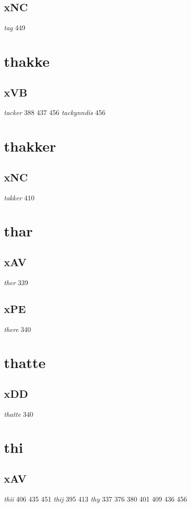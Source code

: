 \documentclass[a4paper,twocolumn]{article}
\begin{document}
\subsection{xNC}
\label{sec:org9d6722d}
\emph{tag} 449 
\section{thakke}
\label{sec:orgc74f534}
\subsection{xVB}
\label{sec:org2efe87d}
\emph{tacker} 388 437 456 \emph{tackynndis} 456 
\section{thakker}
\label{sec:orgca754de}
\subsection{xNC}
\label{sec:org77b5860}
\emph{takker} 410 
\section{thar}
\label{sec:orgdde2f81}
\subsection{xAV}
\label{sec:org96e18a3}
\emph{ther} 339 
\subsection{xPE}
\label{sec:orgb066081}
\emph{there} 340 
\section{thatte}
\label{sec:orgceba893}
\subsection{xDD}
\label{sec:orgae027b4}
\emph{thatte} 340 
\section{thi}
\label{sec:org44eb559}
\subsection{xAV}
\label{sec:orgfcf6059}
\emph{thii} 406 435 451 \emph{thij} 395 413 \emph{thy} 337 376 380 401 409 436 456 
\end{document}
